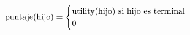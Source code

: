 \documentclass[preview]{standalone}
\begin{document}
\begin{align*}
\text{puntaje(hijo)} =  \begin{cases}\text{utility(hijo) si hijo es terminal} \cr 0 \cr \end{cases}
\end{align*}
\end{document}
